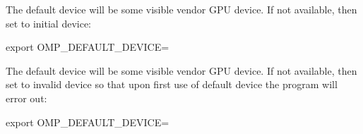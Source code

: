 The default device will be some visible vendor  GPU device. 
If not available, then set to initial device:
\begin{boxedcode}
export OMP_DEFAULT_DEVICE=
\end{boxedcode}

The default device will be some visible vendor  GPU device. 
If not available, then set to invalid device so that upon first use of default 
device the program will error out:
\begin{boxedcode}
export OMP_DEFAULT_DEVICE=
\end{boxedcode}

